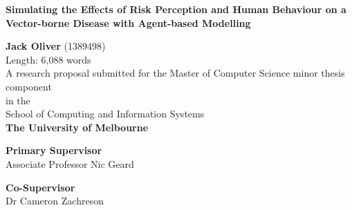 \documentclass[a4paper, titlepage, 12pt]{article}
\newcommand{\thesisTitle}{Simulating the Effects of Risk Perception and Human Behaviour on a Vector-borne Disease with Agent-based Modelling}
\newcommand{\name}{Jack Oliver}
\newcommand{\timeFrame}{School of Computing and Information Systems}
\newcommand{\school}{The University of Melbourne}
\newcommand{\supervisor}{Associate Professor Nic Geard}
\newcommand{\advisor}{Dr Cameron Zachreson}
\newcommand{\wordcount}{6,088}
\begin{document}
\begin{singlespace} %
\begin{titlepage}
\begin{center}



\vspace*{1.5cm}

\Large{\textbf{\thesisTitle}}

\vspace{2.5cm}

\large{\textbf{\name} (1389498) \\ Length: {\wordcount} words} \\
\vspace{2cm}
\large{A research proposal submitted for the Master of Computer Science minor thesis component \\}
\vspace{.5cm}
\large{in the} \\
\large{\timeFrame} \\ 
\large{\textbf{\school}}

\vspace{2cm}

\large{\textbf{Primary Supervisor}}\\
\supervisor\\
\vspace{1.5cm}

\textbf{Co-Supervisor}\\
\advisor\\
\end{center}
\end{titlepage}
\end{singlespace}

\begin{spacing}{1.5}
    \tableofcontents
\end{spacing}
\clearpage



\clearpage


\clearpage






\clearpage

\begin{singlespace}
\printbibliography[heading=bibintoc]
\end{singlespace}
\clearpage

\appendix
\appendixpage

\end{document}
